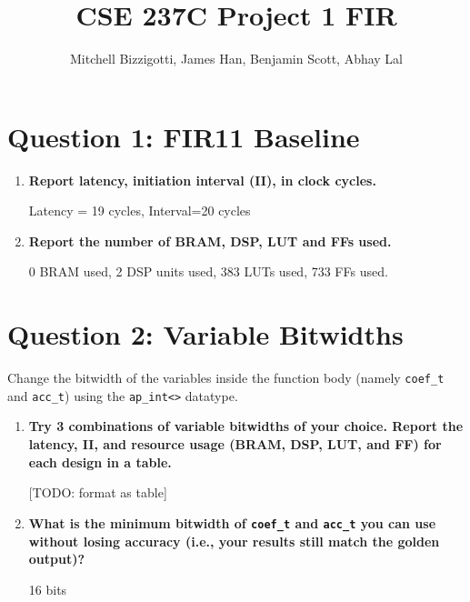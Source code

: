 \documentclass[12pt,a4paper]{article}
\title{CSE 237C Project 1 FIR}
\author{Mitchell Bizzigotti, James Han, Benjamin Scott, Abhay Lal}
\begin{document}
\maketitle


\section*{Question 1: FIR11 Baseline}

\begin{enumerate}
    \item[(a)] \textbf{Report latency, initiation interval (II), in clock cycles.}
    
        Latency = 19 cycles, Interval=20 cycles
    
    \item[(b)] \textbf{Report the number of BRAM, DSP, LUT and FFs used.}

        0 BRAM used, 2 DSP units used, 383 LUTs used, 733 FFs used.
\end{enumerate}


\section*{Question 2: Variable Bitwidths}

Change the bitwidth of the variables inside the function body (namely \verb|coef_t| and \verb|acc_t|) using the \verb|ap_int<>| datatype.

\begin{enumerate}
    \item[(a)] \textbf{Try 3 combinations of variable bitwidths of your choice. Report the latency, II, and resource usage (BRAM, DSP, LUT, and FF) for each design in a table.}
    
        [TODO: format as table]
    
    \item[(b)] \textbf{What is the minimum bitwidth of \texttt{coef\_t} and \texttt{acc\_t} you can use without losing accuracy (i.e., your results still match the golden output)?}
    
        16 bits

\end{enumerate}
\end{document}
